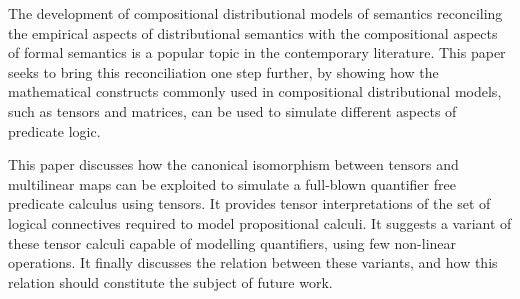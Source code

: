 The development of compositional distributional models of semantics reconciling the empirical aspects of distributional semantics with the compositional
 aspects of formal semantics is a popular topic in the contemporary literature.
 This paper seeks to bring this reconciliation one step further, by showing how
 the mathematical constructs commonly used in compositional distributional
 models, such as tensors and matrices, can be used to simulate different aspects
 of predicate logic. 
 
   This paper discusses how the canonical isomorphism between tensors and
 multilinear maps can be exploited to simulate a full-blown quantifier free
 predicate calculus using tensors. It provides tensor interpretations of the set
 of logical connectives required to model propositional calculi. It suggests a
 variant of these tensor calculi capable of modelling quantifiers, using few
 non-linear operations. It finally discusses the relation between these
 variants, and how this relation should constitute the subject of future work.

